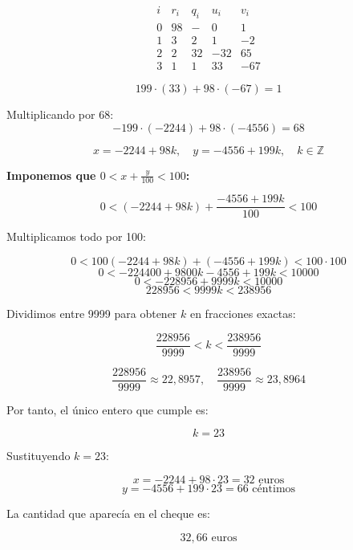 \documentclass[a4paper,12pt]{article}
\begin{document}
\begin{ejercicio}[title=Ejercicio 12]

\[
\begin{array}{c|c|c|c|c}
i & r_i & q_i & u_i & v_i\\
\hline
0 & 98 & - & 0 & 1\\
1 & 3 & 2 & 1 & -2\\
2 & 2 & 32 & -32 & 65\\
3 & \boxed{1} & 1 & 33 & -67
\end{array}
\]

\[
199 \cdot (33) + 98 \cdot (-67) = \boxed{1}
\]

Multiplicando por 68:
\[
-199 \cdot (-2244) + 98 \cdot (-4556) = 68
\]

\[
x = -2244 + 98k, \quad y = -4556 + 199k, \quad k \in \mathbb{Z}
\]

\textbf{Imponemos que $0 < x + \frac{y}{100} < 100$:}

\[
0 < (-2244 + 98k) + \frac{-4556 + 199k}{100} < 100
\]

Multiplicamos todo por 100:

\[
0 < 100(-2244 + 98k) + (-4556 + 199k) < 100 \cdot 100
\]
\[
0 < -224400 + 9800k - 4556 + 199k < 10000
\]
\[
0 < -228956 + 9999 k < 10000
\]
\[
228956 < 9999 k < 238956
\]

Dividimos entre 9999 para obtener $k$ en fracciones exactas:

\[
\frac{228956}{9999} < k < \frac{238956}{9999}
\]

\[
\frac{228956}{9999} \approx 22,8957, \quad \frac{238956}{9999} \approx 23,8964
\]

Por tanto, el único entero que cumple es:

\[
k = 23
\]

Sustituyendo $k = 23$:

\[
x = -2244 + 98 \cdot 23 = 32\text{ euros}
\]
\[
y = -4556 + 199 \cdot 23 = 66\text{ céntimos}
\]

La cantidad que aparecía en el cheque es:

\[
\boxed{32,66 \text{ euros}}
\]
\end{ejercicio}
\end{document}
